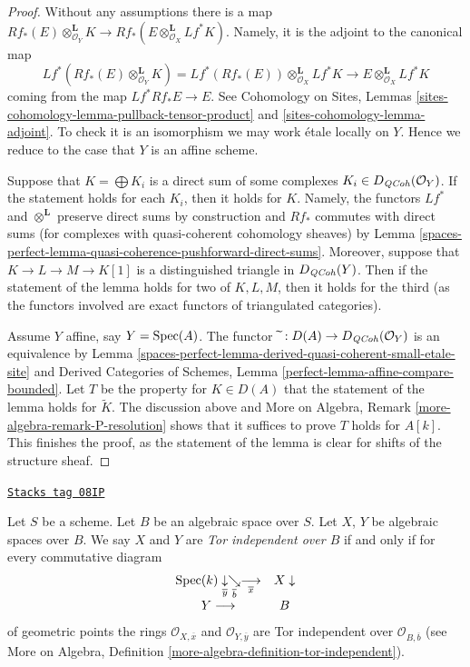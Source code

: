 \begin{proof}
Without any assumptions there is a map
$Rf_*(E) \otimes_{\mathcal{O}_Y}^\mathbf{L} K \to
Rf_*(E \otimes_{\mathcal{O}_X}^\mathbf{L} Lf^*K)$.
Namely, it is the adjoint to the canonical map
$$
Lf^*(Rf_*(E) \otimes_{\mathcal{O}_Y}^\mathbf{L} K) =
Lf^*(Rf_*(E)) \otimes_{\mathcal{O}_X}^\mathbf{L} Lf^*K
\longrightarrow
E \otimes_{\mathcal{O}_X}^\mathbf{L} Lf^*K
$$
coming from the map $Lf^*Rf_*E \to E$. See
Cohomology on Sites, Lemmas
\ref{sites-cohomology-lemma-pullback-tensor-product} and
\ref{sites-cohomology-lemma-adjoint}.
To check it is an isomorphism we may work \'etale locally on $Y$.
Hence we reduce to the case that $Y$ is an affine scheme.

\medskip\noindent
Suppose that $K = \bigoplus K_i$ is a direct
sum of some complexes $K_i \in D_{\mathit{QCoh}}(\mathcal{O}_Y)$.
If the statement holds for each $K_i$, then it holds for $K$.
Namely, the functors $Lf^*$ and $\otimes^\mathbf{L}$ preserve
direct sums by construction and $Rf_*$ commutes with direct sums
(for complexes with quasi-coherent cohomology sheaves) by
Lemma \ref{spaces-perfect-lemma-quasi-coherence-pushforward-direct-sums}.
Moreover, suppose that $K \to L \to M \to K[1]$ is a distinguished
triangle in $D_{\mathit{QCoh}}(Y)$. Then if the statement of the
lemma holds for two of $K, L, M$, then it holds for the third
(as the functors involved are exact functors of triangulated categories).

\medskip\noindent
Assume $Y$ affine, say $Y = \operatorname{Spec}(A)$. The functor
$\widetilde{\ } : D(A) \to D_{\mathit{QCoh}}(\mathcal{O}_Y)$ is an equivalence
by
Lemma \ref{spaces-perfect-lemma-derived-quasi-coherent-small-etale-site} and
Derived Categories of Schemes,
Lemma \ref{perfect-lemma-affine-compare-bounded}.
Let $T$ be the property for $K \in D(A)$ that
the statement of the lemma holds for $\widetilde{K}$.
The discussion above and
More on Algebra, Remark \ref{more-algebra-remark-P-resolution}
shows that it suffices to prove $T$ holds for $A[k]$.
This finishes the proof, as the statement of the lemma
is clear for shifts of the structure sheaf.
\end{proof}

\begin{definition}
\label{spaces-perfect-definition-tor-independent}
\href{https://stacks.math.columbia.edu/tag/08IP}{\texttt{Stacks tag 08IP}}

Let $S$ be a scheme. Let $B$ be an algebraic space over $S$.
Let $X$, $Y$ be algebraic spaces over $B$. We say $X$ and
$Y$ are {\it Tor independent over $B$} if and only if for every
commutative diagram
$$
\begin{array}{cc}\operatorname{Spec}(k) \underset{\overline{y}}{\downarrow}\underset{\overline{b}}{\searrow}\underset{\overline{x}}{\longrightarrow} & X \downarrow \\ Y \longrightarrow & B\end{array}
$$
of geometric points the rings
$\mathcal{O}_{X, \overline{x}}$ and $\mathcal{O}_{Y, \overline{y}}$
are Tor independent over $\mathcal{O}_{B, \overline{b}}$ (see
More on Algebra, Definition \ref{more-algebra-definition-tor-independent}).
\end{definition}

